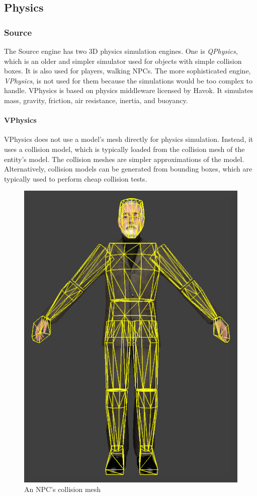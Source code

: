 \documentclass[a4paper, 12pt]{scrartcl}
\begin{document}
\subsection{Physics}
\subsubsection{Source}
The Source engine has two 3D physics simulation engines. One is \textit{QPhysics}, which is an older and simpler simulator used for objects with simple collision boxes. It is also used for players, walking NPCs. The more sophisticated engine, \textit{VPhysics}, is not used for them because the simulations would be too complex to handle. VPhysics is based on physics middleware licensed by Havok. It simulates mass, gravity, friction, air resistance, inertia, and buoyancy.

\paragraph{VPhysics}
VPhysics does not use a model's mesh directly for physics simulation. Instead, it uses a collision model, which is typically loaded from the collision mesh of the entity's model. The collision meshes are simpler approximations of the model. Alternatively, collision models can be generated from bounding boxes, which are typically used to perform cheap collision tests.

\begin{figure}[!ht]
  \centering
  \includegraphics[scale=0.25]{images/source_collision_mesh.png}
  \caption{An NPC's collision mesh}
  \label{fig:source_collision}
\end{figure}
\end{document}
